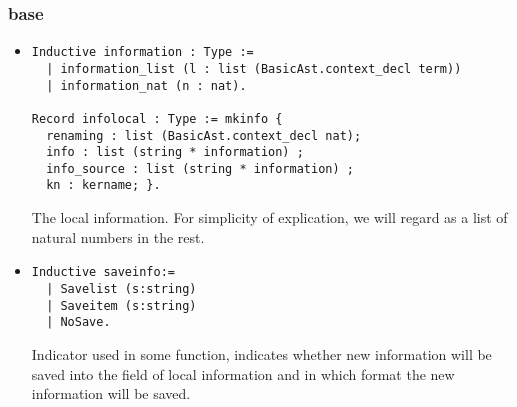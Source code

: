 \documentclass[a4paper,UKenglish,cleveref, autoref, thm-restate]{lipics-v2021}
\begin{document}
\subsubsection{base}
\begin{itemize}

\item
\begin{lstlisting}[language = {Coq}, basicstyle = \small]
Inductive information : Type :=
  | information_list (l : list (BasicAst.context_decl term))
  | information_nat (n : nat).

Record infolocal : Type := mkinfo {
  renaming : list (BasicAst.context_decl nat);
  info : list (string * information) ;
  info_source : list (string * information) ;
  kn : kername; }.
\end{lstlisting}
The local information. For simplicity of explication, we will regard  as a list of natural numbers in the rest.






\item
\begin{lstlisting}[language = {Coq}, basicstyle = \small]
Inductive saveinfo:=
  | Savelist (s:string)
  | Saveitem (s:string)
  | NoSave.
\end{lstlisting}
Indicator used in some function, indicates whether new information will be saved into the  field of local information and in which format the new information will be saved. 





\end{itemize}
\end{document}
